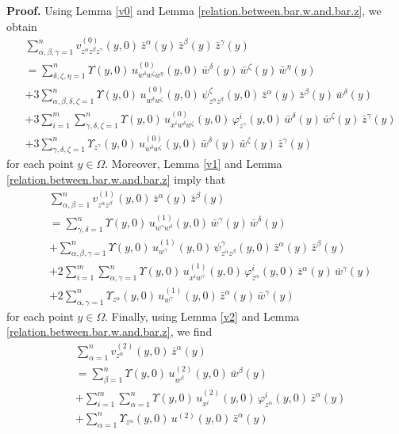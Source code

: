 \documentclass[11pt]{amsart}
\theoremstyle{definition}
\begin{document}
\textbf{Proof.} 
Using Lemma \ref{v0} and Lemma \ref{relation.between.bar.w.and.bar.z}, we obtain 
\begin{align*}
&\sum_{\alpha,\beta,\gamma=1}^n v^{(0)}_{z^\alpha z^\beta z^\gamma}(y,0) \, \bar{z}^\alpha(y) \, \bar{z}^\beta(y) \, \bar{z}^\gamma(y) \\ 
&= \sum_{\delta,\zeta,\eta=1}^n \Upsilon(y,0) \, u^{(0)}_{w^\delta w^\zeta w^\eta}(y,0) \, \bar{w}^\delta(y) \, \bar{w}^\zeta(y) \, \bar{w}^\eta(y) \\ 
&+ 3 \sum_{\alpha,\beta,\delta,\zeta=1}^n \Upsilon(y,0) \, u^{(0)}_{w^\delta w^\zeta}(y,0) \, \psi^\zeta_{z^\alpha z^\beta}(y,0) \, \bar{z}^\alpha(y) \, \bar{z}^\beta(y) \, \bar{w}^\delta(y) \\ 
&+ 3 \sum_{i=1}^m \sum_{\gamma,\delta,\zeta=1}^n \Upsilon(y,0) \, u^{(0)}_{x^i w^\delta w^\zeta}(y,0) \, \varphi^i_{z^\gamma}(y,0) \, \bar{w}^\delta(y) \, \bar{w}^\zeta(y) \, \bar{z}^\gamma(y) \\ 
&+ 3 \sum_{\gamma,\delta,\zeta=1}^n \Upsilon_{z^\gamma}(y,0) \, u^{(0)}_{w^\delta w^\zeta}(y,0) \, \bar{w}^\delta(y) \, \bar{w}^\zeta(y) \, \bar{z}^\gamma(y) 
\end{align*} 
for each point $y \in \Omega$. Moreover, Lemma \ref{v1} and Lemma \ref{relation.between.bar.w.and.bar.z} imply that  
\begin{align*} 
&\sum_{\alpha,\beta=1}^n v^{(1)}_{z^\alpha z^\beta}(y,0) \, \bar{z}^\alpha(y) \, \bar{z}^\beta(y) \\ 
&= \sum_{\gamma,\delta=1}^n \Upsilon(y,0) \, u^{(1)}_{w^\gamma w^\delta}(y,0) \, \bar{w}^\gamma(y) \, \bar{w}^\delta(y) \\ 
&+ \sum_{\alpha,\beta,\gamma=1}^n \Upsilon(y,0) \, u^{(1)}_{w^\gamma}(y,0) \, \psi^\gamma_{z^\alpha z^\beta}(y,0) \, \bar{z}^\alpha(y) \, \bar{z}^\beta(y) \\
&+ 2 \sum_{i=1}^m \sum_{\alpha,\gamma=1}^n \Upsilon(y,0) \, u^{(1)}_{x^i w^\gamma}(y,0) \, \varphi^i_{z^\alpha}(y,0) \, \bar{z}^\alpha(y) \, \bar{w}^\gamma(y) \\ 
&+ 2 \sum_{\alpha,\gamma=1}^n \Upsilon_{z^\alpha}(y,0) \, u^{(1)}_{w^\gamma}(y,0) \, \bar{z}^\alpha(y) \, \bar{w}^\gamma(y) 
\end{align*}
for each point $y \in \Omega$. Finally, using Lemma \ref{v2} and Lemma \ref{relation.between.bar.w.and.bar.z}, we find 
\begin{align*} 
&\sum_{\alpha=1}^n v^{(2)}_{z^\alpha}(y,0) \, \bar{z}^\alpha(y) \\ 
&= \sum_{\beta=1}^n \Upsilon(y,0) \, u^{(2)}_{w^\beta}(y,0) \, \bar{w}^\beta(y) \\ 
&+ \sum_{i=1}^m \sum_{\alpha=1}^n \Upsilon(y,0) \, u^{(2)}_{x^i}(y,0) \, \varphi^i_{z^\alpha}(y,0) \, \bar{z}^\alpha(y) \\ 
&+ \sum_{\alpha=1}^n \Upsilon_{z^\alpha}(y,0) \, u^{(2)}(y,0)  \, \bar{z}^\alpha(y) 
\end{align*}
\end{document}
